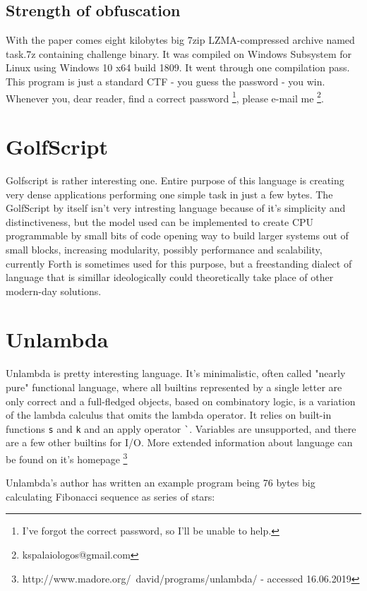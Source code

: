 \documentclass{article}
\begin{document}
\subsection{Strength of obfuscation}
\par With the paper comes eight kilobytes big 7zip LZMA-compressed archive named task.7z containing challenge binary. It was compiled on Windows Subsystem for Linux using Windows 10 x64 build 1809. It went through one compilation pass. This program is just a standard CTF - you guess the password - you win. Whenever you, dear reader, find a correct password \footnote{I've forgot the correct password, so I'll be unable to help.}, please e-mail me \footnote{kspalaiologos@gmail.com}.

\section{GolfScript}
\par Golfscript is rather interesting one. Entire purpose of this language is creating very dense applications performing one simple task in just a few bytes. The GolfScript by itself isn't very intresting language because of it's simplicity and distinctiveness, but the model used can be implemented to create CPU programmable by small bits of code opening way to build larger systems out of small blocks, increasing modularity, possibly performance and scalability, currently Forth is sometimes used for this purpose, but a freestanding dialect of language that is simillar ideologically could theoretically take place of other modern-day solutions.

\section{Unlambda}
\par Unlambda is pretty interesting language. It's minimalistic, often called "nearly pure" functional language, where all builtins represented by a single letter are only correct and a full-fledged objects, based on combinatory logic, is a variation of the lambda calculus that omits the lambda operator. It relies on built-in functions \verb|s| and \verb|k| and an apply operator \verb|`|. Variables are unsupported, and there are a few other builtins for I/O. More extended information about language can be found on it's homepage \footnote{http://www.madore.org/~david/programs/unlambda/ - accessed 16.06.2019}

\par Unlambda's author has written an example program being 76 bytes big calculating Fibonacci sequence as series of stars:
\end{document}
